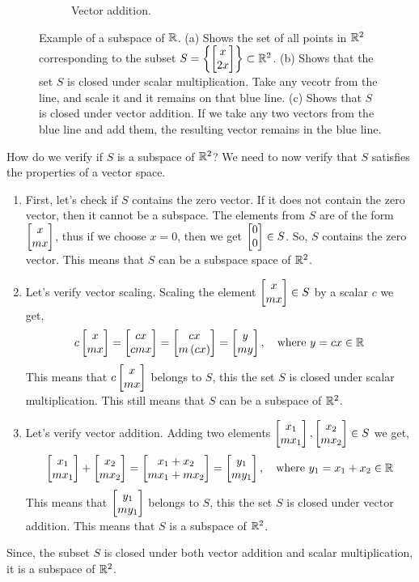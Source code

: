 \begin{example}
\begin{figure}[h]
\begin{subfigure}[b]{0.32\textwidth}
        \caption{Vector addition.}
        \label{fig:subspace1-addition}
    \end{subfigure}
    \caption{Example of a subspace of $\mathbb{R}$. (a) Shows the set of all points in $\mathbb{R}^2$ corresponding to the subset $S = \left\{ \bmxc x \\ 2 x\emx\right\} \subset \mb{R}^2$. (b) Shows that the set $S$ is closed under scalar multiplication. Take any vecotr from the line, and scale it and it remains on that blue line. (c) Shows that $S$ is closed under vector addition. If we take any two vectors from the blue line and add them, the resulting vector remains in the blue line.}
    \end{figure}    
    
    \noindent How do we verify if $S$ is a subspace of $\mathbb{R}^2$? We need to now verify that $S$ satisfies the properties of a vector space.
    \begin{enumerate}
        \item First, let's check if $S$ contains the zero vector. If it does not contain the zero vector, then it cannot be a subspace. The elements from $S$ are of the form $\bmxc x \\ m x\emx$, thus if we choose $x = 0$, then we get $\bmx 0 \\ 0 \emx \in S$. So, $S$ contains the zero vector. This means that $S$ can be a subspace space of $\mathbb{R}^2$.
        \item Let's verify vector scaling. Scaling the element $\bmxc x \\ m x \emx \in S$ by a scalar $c$ we get,
        \[ c \bmxc x \\ m x\emx = \bmxc c x \\ c m x \emx = \bmxc c x \\ m \pp{c x} \emx = \bmxc y \\ m y\emx, \quad \text{where} \,\, y = c x \in \mb{R} \]
        This means that $c\bmxc x \\ m x\emx$ belongs to $S$, this the set $S$ is closed under scalar multiplication. This still means that $S$ can be a subspace of $\mathbb{R}^2$.
        \item Let's verify vector addition. Adding two elements $\bmxc x_1 \\ m x_1\emx, \bmxc x_2 \\ m x_2\emx \in S$ we get,
        \[ \bmxc x_1 \\ m x_1\emx + \bmxc x_2 \\ m x_2\emx = \bmxc x_1 + x_2 \\ m x_1 + m x_2 \emx = \bmxc y_1 \\ m y_1\emx, \quad \text{where} \,\, y_1 = x_1 + x_2 \in \mb{R} \]
        This means that $\bmxc y_1 \\ m y_1\emx$ belongs to $S$, this the set $S$ is closed under vector addition. This means that $S$ is a subspace of $\mathbb{R}^2$.
    \end{enumerate}
    Since, the subset $S$ is closed under both vector addition and scalar multiplication, it is a subspace of $\mathbb{R}^2$.
    \label{example:subspace-straight-line}
\end{example}

